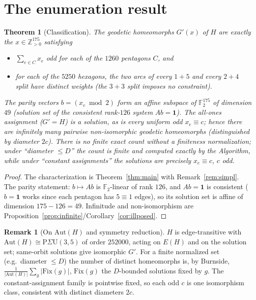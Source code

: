 \documentclass{amsart}
\newtheorem{theorem}{Theorem}
\theoremstyle{definition}
\newtheorem{remark}{Remark}
\begin{document}
\section{The enumeration result}

\begin{theorem}[Classification]\label{thm:class}
The geodetic homeomorphs $G'(x)$ of $H$ are exactly the $x\in\mathbb Z_{>0}^{175}$
satisfying
\begin{itemize}
\item[\textnormal{(P)}] $\sum_{e\in C}x_e$ odd for each of the $1260$ pentagons
$C$, and
\item[\textnormal{(H)}] for each of the $5250$ hexagons, the two arcs of every
$1{+}5$ and every $2{+}4$ split have distinct weights (the $3{+}3$ split imposes
no constraint).
\end{itemize}
The parity vectors $b=(x_e\bmod2)$ form an affine subspace of $\mathbb F_2^{175}$
of dimension $49$ (solution set of the consistent rank-$126$ system
$Ab=\mathbf1$). The all-ones assignment ($G'=H$) is a solution, as is every
uniform odd $x_e\equiv c$; hence there are infinitely many pairwise
non-isomorphic geodetic homeomorphs (distinguished by diameter $2c$). There is no
finite exact count without a finiteness normalization; under ``diameter $\le D$''
the count is finite and computed exactly by the Algorithm, while under ``constant
assignments'' the solutions are precisely $x_e\equiv c$, $c$ odd.
\end{theorem}

\begin{proof}
The characterization is Theorem~\ref{thm:main} with Remark~\ref{rem:simpl}. The
parity statement: $b\mapsto Ab$ is $\mathbb F_2$-linear of rank $126$, and
$Ab=\mathbf1$ is consistent ($b=\mathbf1$ works since each pentagon has $5\equiv1$
edges), so its solution set is affine of dimension $175-126=49$. Infinitude and
non-isomorphism are Proposition~\ref{prop:infinite}/Corollary~\ref{cor:illposed}.
\end{proof}

\begin{remark}[On $\mathrm{Aut}(H)$ and symmetry reduction]
$H$ is edge-transitive with $\mathrm{Aut}(H)\cong\mathrm P\Sigma\mathrm U(3,5)$
of order $252000$, acting on $E(H)$ and on the solution set; same-orbit solutions
give isomorphic $G'$. For a finite normalized set (e.g.\ diameter $\le D$) the
number of distinct homeomorphs is, by Burnside,
$\frac1{|\mathrm{Aut}(H)|}\sum_g|\mathrm{Fix}(g)|$, $\mathrm{Fix}(g)$ the
$D$-bounded solutions fixed by $g$. The constant-assignment family is pointwise
fixed, so each odd $c$ is one isomorphism class, consistent with distinct
diameters $2c$.
\end{remark}
\end{document}
